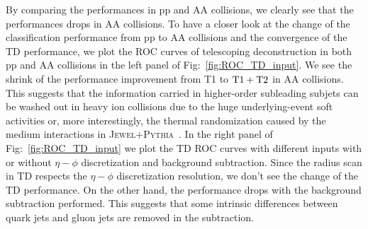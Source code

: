 \documentclass[notoc]{JHEP3}
\newcommand{\jwpy}{\textsc{Jewel+Pythia}~}
\begin{document}
By comparing the performances in pp and AA collisions, we clearly see that the performances drops in AA collisions. To have a closer look at the change of the classification performance from pp to AA collisions and the convergence of the TD performance, we plot the ROC curves of telescoping deconstruction in both pp and AA collisions in the left panel of Fig:~\ref{fig:ROC_TD_input}. We see the shrink of the performance improvement from T1 to $\rm T1+T2$ in AA collisions. This suggests that the information carried in higher-order subleading subjets can be washed out in heavy ion collisions due to the huge underlying-event soft activities or, more interestingly, the thermal randomization caused by the medium interactions in \jwpy. In the right panel of Fig:~\ref{fig:ROC_TD_input} we plot the TD ROC curves with different inputs with or without $\eta-\phi$ discretization and background subtraction. Since the radius scan in TD respects the $\eta-\phi$ discretization resolution, we don't see the change of the TD performance. On the other hand, the performance drops with the background subtraction performed. This suggests that some intrinsic differences between quark jets and gluon jets are removed in the subtraction. 
\end{document}
